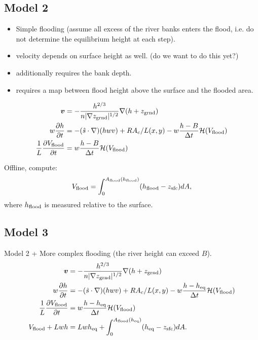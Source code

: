 \documentclass[twoside,10pt]{report}
\begin{document}
\subsection{Model 2}
\begin{itemize}
    \item  Simple flooding (assume all excess of the river banks enters the flood, i.e. do not determine the equilibrium height at each step).
    \item velocity depends on surface height as well. (do we want to do this yet?)
    \item additionally requires the bank depth.
    \item requires a map between flood height above the surface and the flooded area.
\end{itemize}
\begin{align}
     \vec{v} &= -\frac{h^{2/3}}{n|\nabla z_{\rm grnd}|^{1/2}}\nabla (h+z_{\rm grnd}) \nonumber \\
     w\frac{\partial h}{\partial t} &= -(\hat{s} \cdot \nabla) (hwv) +  R A_c/L(x,y) - w\frac{h-B}{\Delta t}\mathcal{H}(V_{\rm flood}) \nonumber \\
     \frac{1}{L}\frac{\partial V_{\rm flood}}{\partial t} & = w\frac{h-B}{\Delta t}\mathcal{H}(V_{\rm flood})
\end{align}

Offline, compute:
\begin{equation}
        V_{\rm flood}=\int_0^{A_{\rm flood}(h_{\rm flood})} (h_{\rm flood} - z_{\rm sfc}) dA,
\end{equation}
where $h_{\rm flood}$ is measured relative to the surface.
\subsection{Model 3}
Model 2 + More complex flooding (the river height can exceed $B$).
\begin{align}
     \vec{v} &= -\frac{h^{2/3}}{n|\nabla z_{\rm grnd}|^{1/2}}\nabla (h+z_{\rm grnd}) \nonumber \\
     w\frac{\partial h}{\partial t} &= -(\hat{s} \cdot \nabla) (hwv)  +  R A_c/L(x,y) - w\frac{h-h_{\rm eq}}{\Delta t}\mathcal{H}(V_{\rm flood}) \nonumber \\
     \frac{1}{L}\frac{\partial V_{\rm flood}}{\partial t} & = w\frac{h-h_{\rm eq}}{\Delta t}\mathcal{H}(V_{\rm flood}) \nonumber \\
    V_{\rm flood}+ Lwh &= L wh_{\rm eq} + \int_0^{A_{\rm flood}(h_{\rm eq})} (h_{\rm eq} - z_{\rm sfc}) dA.
\end{align}
\end{document}

